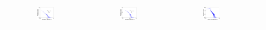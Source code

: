 \documentclass[11pt,a4paper]{book}
\newcommand{\wFourMinusTabular}{0.227}
\begin{document}
\begin{figure}[h!]
  \begin{tabular}{c c c c}
    \includegraphics[width=\wFourMinusTabular\textwidth]{img-st/degree.ux.epinions} &
    \includegraphics[width=\wFourMinusTabular\textwidth]{img-st/degree.ux.facebook-wosn-wall} &
    \includegraphics[width=\wFourMinusTabular\textwidth]{img-st/degree.u.filmtipset_rating} &

\end{tabular}
\end{figure}
\end{document}
